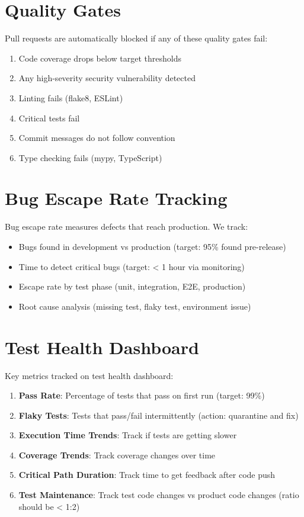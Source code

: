 \documentclass{report}
\begin{document}
\section{Quality Gates}

Pull requests are automatically blocked if any of these quality gates fail:

\begin{enumerate}
  \item Code coverage drops below target thresholds
  \item Any high-severity security vulnerability detected
  \item Linting fails (flake8, ESLint)
  \item Critical tests fail
  \item Commit messages do not follow convention
  \item Type checking fails (mypy, TypeScript)
\end{enumerate}

\section{Bug Escape Rate Tracking}

Bug escape rate measures defects that reach production. We track:

\begin{itemize}
  \item Bugs found in development vs production (target: 95\% found pre-release)
  \item Time to detect critical bugs (target: < 1 hour via monitoring)
  \item Escape rate by test phase (unit, integration, E2E, production)
  \item Root cause analysis (missing test, flaky test, environment issue)
\end{itemize}

\section{Test Health Dashboard}

Key metrics tracked on test health dashboard:

\begin{enumerate}
  \item \textbf{Pass Rate}: Percentage of tests that pass on first run (target: 99\%)
  \item \textbf{Flaky Tests}: Tests that pass/fail intermittently (action: quarantine and fix)
  \item \textbf{Execution Time Trends}: Track if tests are getting slower
  \item \textbf{Coverage Trends}: Track coverage changes over time
  \item \textbf{Critical Path Duration}: Track time to get feedback after code push
  \item \textbf{Test Maintenance}: Track test code changes vs product code changes (ratio should be < 1:2)
\end{enumerate}
\end{document}
